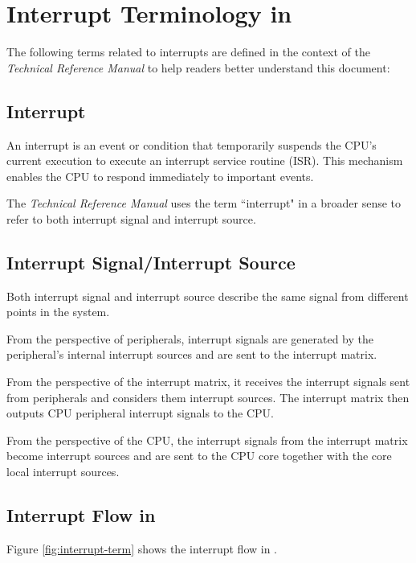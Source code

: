 \documentclass[main\_\_EN.tex]{subfiles}
\begin{document}
\section{Interrupt Terminology in \chipname{}}\label{sec:intmtx-int-terminology}

The following terms related to interrupts are defined in the context of the \textit{\chipname{} Technical Reference Manual} to help readers better understand this document:

\subsection{Interrupt}

An interrupt is an event or condition that temporarily suspends the CPU's current execution to execute an interrupt service routine (ISR). This mechanism enables the CPU to respond immediately to important events.

The \textit{\chipname{} Technical Reference Manual} uses the term ``interrupt" in a broader sense to refer to both interrupt signal and interrupt source.

\subsection{Interrupt Signal/Interrupt Source}

Both interrupt signal and interrupt source describe the same signal from different points in the system.

From the perspective of peripherals, interrupt signals are generated by the peripheral's internal interrupt sources and are sent to the interrupt matrix.

From the perspective of the interrupt matrix, it receives the interrupt signals sent from peripherals and considers them interrupt sources. The interrupt matrix then outputs CPU peripheral interrupt signals to the CPU.

From the perspective of the CPU, the interrupt signals from the interrupt matrix become interrupt sources and are sent to the CPU core together with the core local interrupt sources.

\subsection{Interrupt Flow in \chipname{}}

Figure \ref{fig:interrupt-term} shows the interrupt flow in \chipname{}.
\end{document}

